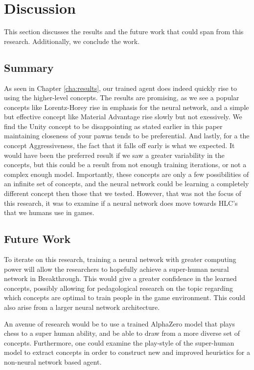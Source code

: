\chapter{Discussion}

This section discusses the results and the future work that could span from this research. Additionally, we conclude the work.

\section{Summary}

As seen in Chapter \ref{cha:results}, our trained agent does indeed quickly rise to using the higher-level concepts. The results are promising, as we see a popular concepts like Lorentz-Horey rise in emphasis for the neural network, and a simple but effective concept like Material Advantage rise slowly but not exessively. We find the Unity concept to be disappointing as stated earlier in this paper maintaining closeness of your pawns tends to be preferential. And lastly, for a the concept Aggressiveness, the fact that it falls off early is what we expected. It would have been the preferred result if we saw a greater variability in the concepts, but this could be a result from not enough training iterations, or not a complex enough model. Importantly, these concepts are only a few possibilities of an infinite set of concepts, and the neural network could be learning a completely different concept then those that we tested. However, that was not the focus of this research, it was to examine if a neural network does move towards HLC's that we humans use in games.

\section{Future Work}

To iterate on this research, training a neural network with greater computing power will allow the researchers to hopefully achieve a super-human neural network in Breakthrough. This would give a greater confidence in the learned concepts, possibly allowing for pedagological research on the topic regarding which concepts are optimal to train people in the game environment. This could also arise from a larger neural network architecture.

An avenue of research would be to use a trained AlphaZero model that plays chess to a super human ability, and be able to draw from a more diverse set of concepts. Furthermore, one could examine the play-style of the super-human model to extract concepts in order to construct new and improved heuristics for a non-neural network based agent.

